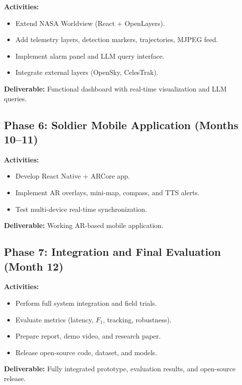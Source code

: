 \textbf{Activities:}
\begin{itemize}
    \item Extend NASA Worldview (React + OpenLayers).
    \item Add telemetry layers, detection markers, trajectories, MJPEG feed.
    \item Implement alarm panel and LLM query interface.
    \item Integrate external layers (OpenSky, CelesTrak).
\end{itemize}

\textbf{Deliverable:} Functional dashboard with real-time visualization and LLM queries.

\subsection{Phase 6: Soldier Mobile Application (Months 10--11)}

\textbf{Activities:}
\begin{itemize}
    \item Develop React Native + ARCore app.
    \item Implement AR overlays, mini-map, compass, and TTS alerts.
    \item Test multi-device real-time synchronization.
\end{itemize}

\textbf{Deliverable:} Working AR-based mobile application.

\subsection{Phase 7: Integration and Final Evaluation (Month 12)}

\textbf{Activities:}
\begin{itemize}
    \item Perform full system integration and field trials.
    \item Evaluate metrics (latency, $F_1$, tracking, robustness).
    \item Prepare report, demo video, and research paper.
    \item Release open-source code, dataset, and models.
\end{itemize}

\textbf{Deliverable:} Fully integrated prototype, evaluation results, and open-source release.

